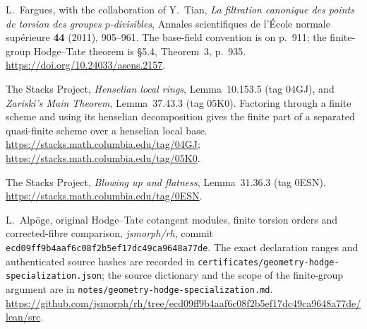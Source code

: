 L.~Fargues, with the collaboration of Y.~Tian,
\emph{La filtration canonique des points de torsion des groupes
$p$-divisibles}, Annales scientifiques de l'\'Ecole normale
sup\'erieure \textbf{44} (2011), 905--961.
The base-field convention is on p.~911; the finite-group
Hodge--Tate theorem is \S5.4, Theorem~3, p.~935.
\url{https://doi.org/10.24033/asens.2157}.

The Stacks Project, \emph{Henselian local rings},
Lemma~10.153.5 (tag 04GJ), and \emph{Zariski's Main Theorem},
Lemma~37.43.3 (tag 05K0). Factoring through a finite scheme and
using its henselian decomposition gives the finite part of a
separated quasi-finite scheme over a henselian local base.
\url{https://stacks.math.columbia.edu/tag/04GJ};
\url{https://stacks.math.columbia.edu/tag/05K0}.

The Stacks Project, \emph{Blowing up and flatness},
Lemma~31.36.3 (tag 0ESN).
\url{https://stacks.math.columbia.edu/tag/0ESN}.

L.~Alp\"oge, original Hodge--Tate cotangent modules, finite torsion
orders and corrected-fibre comparison, \emph{jsmorph/rh}, commit
\texttt{ecd09ff9b4aaf6c08f2b5ef17dc49ca9648a77de}.
The exact declaration ranges and authenticated source hashes are
recorded in \texttt{certificates/geometry-hodge-specialization.json};
the source dictionary and the scope of the finite-group argument
are in \texttt{notes/geometry-hodge-specialization.md}.
\url{https://github.com/jsmorph/rh/tree/ecd09ff9b4aaf6c08f2b5ef17dc49ca9648a77de/lean/src}.
